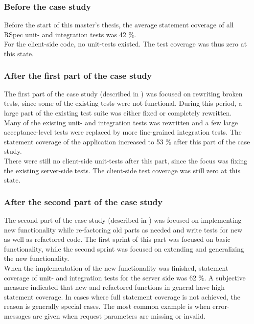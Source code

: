 \subsubsection{Before the case study}

Before the start of this master's thesis, the average statement coverage
of all RSpec unit- and integration tests was 42 \%.\\

For the client-side code, no unit-tests existed. The test coverage was
thus zero at this state.\\


\subsubsection{After the first part of the case study}

The first part of the case study (described in )
was focused on rewriting broken tests, since some of the existing tests
were not functional. During this period, a large part of the existing
test suite was either fixed or completely rewritten. Many of the
existing unit- and integration tests was rewritten and a few large
acceptance-level tests were replaced by more fine-grained integration
tests. The statement coverage of the application increased to 53 \%
after this part of the case study.\\

There were still no client-side unit-tests after this part, since the
focus was fixing the existing server-side tests. The client-side test
coverage was still zero at this state.\\

\subsubsection{After the second part of the case study}
\label{sec:result_coverage_end}

The second part of the case study (described in )
was focused on implementing new functionality while re-factoring old
parts as needed and write tests for new as well as refactored code. The
first sprint of this part was focused on basic functionality, while the
second sprint was focused on extending and generalizing the new
functionality.\\

When the implementation of the new functionality was finished, statement
coverage of unit- and integration tests for the server side was 62 \%. A
subjective measure indicated that new and refactored functions in
general have high statement coverage. In cases where full statement
coverage is not achieved, the reason is generally special cases. The
most common example is when error-messages are given when request
parameters are missing or invalid.\\

